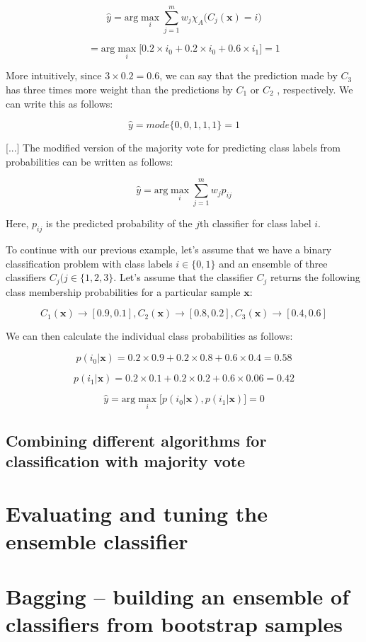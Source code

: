 \documentclass[letterpaper]{report}
\begin{document}
\[
\hat{y} = \text{arg}\max_i \sum_{j=1}^{m} w_j \chi_A \big( C_j(\mathbf{x}) = i \big)
\]

\[
= \text{arg}\max_i \big[0.2 \times i_0 + 0.2 \times i_0 + 0.6 \times i_1 \big] = 1
\]

More intuitively, since $3 \times 0.2 = 0.6$, we can say that the prediction made by $C_3$ has three times more weight than the predictions by $C_1$ or $C_2$ , respectively. We can write this as follows:

\[
\hat{y} = mode\{0,0,1,1,1\} = 1
\]

[...] The modified version of the majority vote for predicting class labels from probabilities can be written as follows:

\[
\hat{y} = \text{arg} \max_i \sum^{m}_{j=1} w_j p_{ij}
\]

Here, $p_{ij}$ is the predicted probability of the $j$th classifier for class label $i$.

To continue with our previous example, let's assume that we have a binary classification problem with class labels $i \in \{0, 1\}$ and an ensemble of three classifiers $C_j (j \in \{1, 2, 3\}$. Let's assume that the classifier $C_j$ returns the following class membership probabilities for a particular sample $\mathbf{x}$:

\[
C_1(\mathbf{x}) \rightarrow [0.9, 0.1], C_2 (\mathbf{x}) \rightarrow [0.8, 0.2], C_3(\mathbf{x}) \rightarrow [0.4, 0.6]
\]

We can then calculate the individual class probabilities as follows:

\[
p(i_0 | \mathbf{x}) = 0.2 \times 0.9 + 0.2 \times 0.8 + 0.6 \times 0.4 = 0.58
\]

\[
p(i_1 | \mathbf{x}) = 0.2 \times 0.1 + 0.2 \times 0.2 + 0.6 \times 0.06 = 0.42
\]

\[
\hat{y} = \text{arg} \max_i \big[ p(i_0 | \mathbf{x}), p(i_1 | \mathbf{x})   \big] = 0
\]

\subsection{Combining different algorithms for classification with majority vote}
\section{Evaluating and tuning the ensemble classifier}
\section{Bagging -- building an ensemble of classifiers from bootstrap samples}
\end{document}
